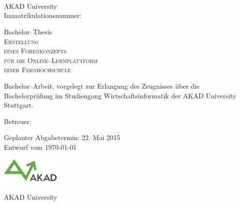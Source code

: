 

\begin{titlepage}


\vspace{5cm}

\Name \\ 
\Strasse \\ 
\PlzOrt\\ 
\href{mailto:\Email}{\Email}

AKAD University\\
Immatrikulationsnummer: \Immatrikulationsnummer

\vfill

Bachelor--Thesis\\
\LARGE
\textsc{Erstellung\\
eines Forenkonzepts\\
für die Online--Lernplattform\\
einer Fernhochschule}

\vfill

\normalsize

Bachelor--Arbeit, vorgelegt zur Erlangung des Zeugnisses über die Bachelorprüfung im Studiengang Wirtschaftsinformatik der AKAD University Stuttgart.

Betreuer: \Betreuer

Geplanter Abgabetermin: 22. Mai 2015\\
Entwurf vom \today %


\vfill

\includegraphics[width=3cm]{akad_logo.png}  

AKAD University 

\end{titlepage}



\normalsize

